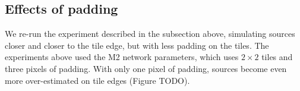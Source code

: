 \subsection{Effects of padding}
We re-run the experiment described in the subsection above, 
simulating sources closer and closer to the tile edge, 
but with less padding on the tiles. 
The experiments above used the M2 network parameters, 
which uses $2\times 2$ tiles and three pixels of padding. 
With only one pixel of padding, sources become even more 
over-estimated on tile edges (Figure TODO). 